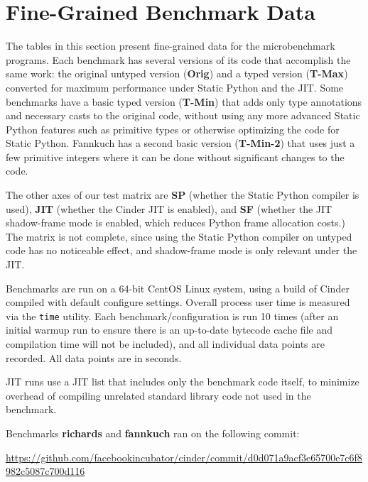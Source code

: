 \documentclass[english,cleveref,submission]{programming}
\newcommand{\code}[1]{\texttt{#1}}
\newcommand{\bmname}[1]{\textbf{#1}}
\begin{document}
\section{Fine-Grained Benchmark Data}
\label{a:microbench-detail}

\newcommand{\colname}[1]{\textbf{#1}}

The tables in this section present fine-grained data for the microbenchmark programs.
Each benchmark has several versions of its code that accomplish the same work:
the original untyped version (\colname{Orig}) and a typed version (\colname{T-Max}) converted for maximum
performance under Static Python and the JIT.
Some benchmarks have a basic typed version (\colname{T-Min}) that adds only
type annotations and necessary casts to the original code,
without using any more advanced Static Python
features such as primitive types or otherwise optimizing the code for Static
Python.
Fannkuch has a second basic version (\colname{T-Min-2}) that uses just a few primitive integers
where it can be done without significant changes to the code.

The other axes of our test matrix are \colname{SP} (whether the Static Python compiler is
used), \colname{JIT} (whether the Cinder JIT is enabled), and \colname{SF} (whether the JIT
shadow-frame mode is enabled, which reduces Python frame allocation costs.) The
matrix is not complete, since using the Static Python compiler on untyped code
has no noticeable effect, and shadow-frame mode is only relevant under the JIT.

Benchmarks are run on a 64-bit CentOS Linux system, using a build of Cinder
compiled with default configure settings. Overall process user time is measured
via the \code{time} utility. Each benchmark/configuration is run 10 times (after an
initial warmup run to ensure there is an up-to-date bytecode cache file and
compilation time will not be included), and all individual data points are
recorded. All data points are in seconds.

JIT runs use a JIT list that includes only the benchmark code itself, to
minimize overhead of compiling unrelated standard library code not used in the
benchmark.

Benchmarks \bmname{richards} and \bmname{fannkuch} ran on the following commit:

\begin{center}
\footnotesize\url{https://github.com/facebookincubator/cinder/commit/d0d071a9acf3e65700e7c6f8982c5087c700d116}
\end{center}
\end{document}
